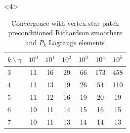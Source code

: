 \documentclass[presentation,aspectratio=43,10pt]{beamer}
\newcommand{\convexpath}[2]{
  [
  create hullcoords/.code={
    \global\edef\namelist{#1}
    \foreach [count=\counter] \nodename in \namelist {
      \global\edef\numberofnodes{\counter}
      \coordinate (hullcoord\counter) at (\nodename);
    }
    \coordinate (hullcoord0) at (hullcoord\numberofnodes);
    \pgfmathtruncatemacro\lastnumber{\numberofnodes+1}
    \coordinate (hullcoord\lastnumber) at (hullcoord1);
  },
  create hullcoords
  ]
  ($(hullcoord1)!#2!-90:(hullcoord0)$)
  \foreach [
  evaluate=\currentnode as \previousnode using \currentnode-1,
  evaluate=\currentnode as \nextnode using \currentnode+1
  ] \currentnode in {1,...,\numberofnodes} {
    let \p1 = ($(hullcoord\currentnode) - (hullcoord\previousnode)$),
    \n1 = {atan2(\y1,\x1) + 90},
    \p2 = ($(hullcoord\nextnode) - (hullcoord\currentnode)$),
    \n2 = {atan2(\y2,\x2) + 90},
    \n{delta} = {Mod(\n2-\n1,360) - 360}
    in
    {arc [start angle=\n1, delta angle=\n{delta}, radius=#2]}
    -- ($(hullcoord\nextnode)!#2!-90:(hullcoord\currentnode)$)
  }
}
\begin{document}
\begin{frame}[fragile]
\begin{onlyenv}
\begin{columns}
\begin{column}{0.4\textwidth}
\begin{center}
        \end{center}
      \end{column}
    \end{columns}
  \end{onlyenv}
  \begin{onlyenv}<4>
    \begin{table}
      \centering
      {\footnotesize
      \begin{tabular}{l|cccccc}
        $k\backslash \gamma$ & $10^0$ & $10^1$ & $10^2$ & $10^3$ & $10^4$ & $10^5$ \\
        \hline
        3                    & 11     & 16     & 29     & 66     & 173    & 458    \\
        4                    & 11     & 13     & 19     & 26     & 54     & 110    \\
        5                    & 11     & 12     & 16     & 19     & 20     & 19     \\
        6                    & 10     & 11     & 14     & 15     & 16     & 15     \\
        7                    & 10     & 11     & 13     & 14     & 14     & 13     \\
      \end{tabular}
      \caption{Convergence with vertex star patch preconditioned Richardson
        smoothers and $P_k$ Lagrange elements}
      }
    \end{table}
  \end{onlyenv}
\end{frame}
\end{document}
